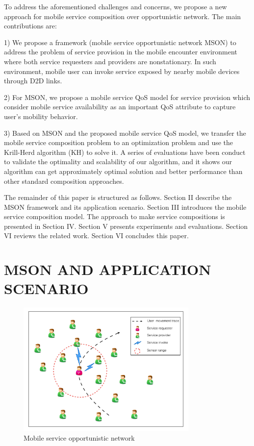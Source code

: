 \documentclass[10pt,journal,compsoc]{IEEEtran}
\begin{document}
To address the aforementioned challenges and concerns, we propose a new approach for mobile service composition over opportunistic network. The main contributions are:

1) We propose a framework (mobile service opportunistic network MSON) to address the problem of service provision in the mobile encounter environment where both service requesters and providers are nonstationary. In such environment, mobile user can invoke service exposed by nearby mobile devices through D2D links.

2) For MSON, we propose a mobile service QoS model for service provision which consider mobile service availability as an important QoS attribute to capture user's mobility behavior.

3) Based on MSON and the proposed mobile service QoS model, we transfer the mobile service composition problem to an optimization problem and use the Krill-Herd algorithm (KH) to solve it. A series of evaluations have been conduct to validate the optimality and scalability of our algorithm, and it shows our algorithm can get approximately optimal solution and better performance than other standard composition approaches. 

The remainder of this paper is structured as follows. Section II describe the MSON framework and its application scenario. Section III introduces the mobile service composition model. The approach to make service compositions is presented in Section IV. Section V presents experiments and evaluations. Section VI reviews the related work. Section VI concludes this paper.

\section{MSON AND APPLICATION SCENARIO}

\begin{figure}[!t]
\centering
\includegraphics[width=3.5in]{./img/pic2.pdf}
\caption{Mobile service opportunistic network}
\label{fig_mson}
\end{figure}
\end{document}
